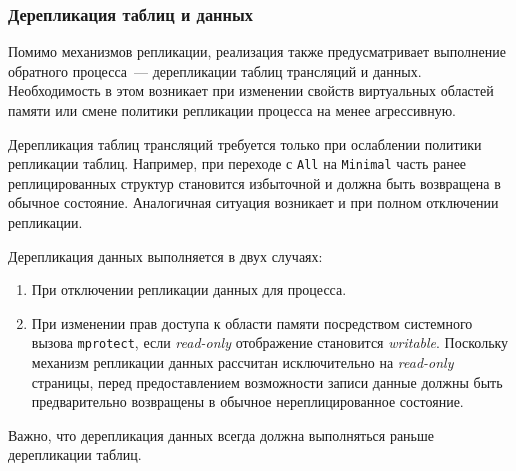 \subsubsection{Дерепликация таблиц и данных}
\label{sec:Chapter3_data_table_derepl}

Помимо механизмов репликации, реализация также предусматривает выполнение обратного процесса~--- дерепликации таблиц трансляций и данных. Необходимость в этом возникает при изменении свойств виртуальных областей памяти или смене политики репликации процесса на менее агрессивную.

Дерепликация таблиц трансляций требуется только при ослаблении политики репликации таблиц. Например, при переходе с \texttt{All} на \texttt{Minimal} часть ранее реплицированных структур становится избыточной и должна быть возвращена в обычное состояние. Аналогичная ситуация возникает и при полном отключении репликации.

Дерепликация данных выполняется в двух случаях:
\begin{enumerate}
    \item При отключении репликации данных для процесса.
    \item При изменении прав доступа к области памяти посредством системного вызова \texttt{mprotect}, если \textit{read-only} отображение становится \textit{writable}. Поскольку механизм репликации данных рассчитан исключительно на \textit{read-only} страницы, перед предоставлением возможности записи данные должны быть предварительно возвращены в обычное нереплицированное состояние.
\end{enumerate}

Важно, что дерепликация данных всегда должна выполняться раньше дерепликации таблиц.

